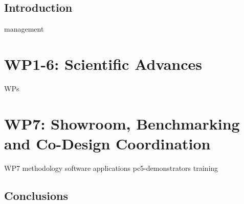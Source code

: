 \documentclass[11pt]{report}
\begin{document}

\makecover%


\clearpage
{}
\settableofcontents%
\tableofcontents


\clearpage
\setlistoffigures%
\listoffigures


\clearpage
\setlistoftables%
\listoftables







\chapter{Introduction}
\label{chap:introduction}

{management}
\part{WP1-6: Scientific Advances}
{WPs}
\part{WP7: Showroom, Benchmarking and Co-Design Coordination}
{WP7}
{methodology}
{software}
{applications}
{pc5-demonstrators}
{training}

\chapter{Conclusions}
\label{chap:conclusions}



\clearpage




\appendix






\PrintTodoList
\makedisclaimer%
\end{document}
